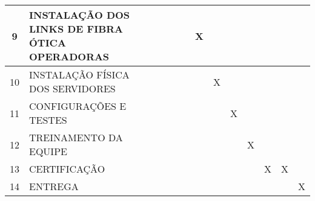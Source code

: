 \begin{table}[H]
{\begin{tabular}{|c|l|l|l|l|l|l|l|l|l|l|l|l|l|}
		9                              & INSTALAÇÃO DOS LINKS DE FIBRA ÓTICA OPERADORAS        &         &         &        &        &         & X       &        &        &         &         &        &        \\ \hline
		10                             & INSTALAÇÃO FÍSICA DOS SERVIDORES                      &         &         &        &        &         &         & X      &        &         &         &        &        \\ \hline
		11                             & CONFIGURAÇÕES E TESTES                                &         &         &        &        &         &         &        & X      &         &         &        &        \\ \hline
		12                             & TREINAMENTO DA EQUIPE                                 &         &         &        &        &         &         &        &        & X       &         &        &        \\ \hline
		13                             & CERTIFICAÇÃO                                          &         &         &        &        &         &         &        &        &         & X       & X      &        \\ \hline
		14                             & ENTREGA                                               &         &         &        &        &         &         &        &        &         &         &        & X      \\ \hline
	\end{tabular}}
\end{table}
